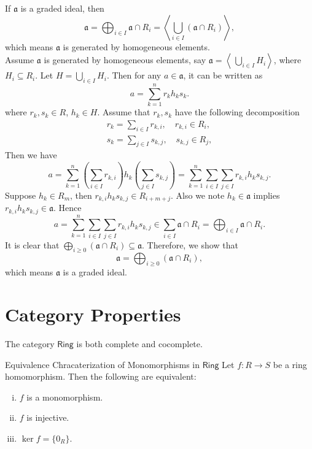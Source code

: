 \begin{prf}
If $\mathfrak{a}$ is a graded ideal, then 
\[
    \mathfrak{a}=\bigoplus_{i\in I}\mathfrak{a}\cap R_i=\left\langle \bigcup_{i\in I}\left( \mathfrak{a}\cap R_i\right)\right\rangle,
\]
which means $\mathfrak{a}$ is generated by homogeneous elements.\\

Assume $\mathfrak a$ is generated by homogeneous elements, say $\mathfrak a = \left\langle\, \bigcup_{i\in I}H_i \right\rangle$, where $H_i\subseteq R_i$. Let $H=\bigcup_{i\in I}H_i $. Then for any $a\in\mathfrak a$, it can be written as
\[
a=\sum_{k=1}^nr_k h_ks_k.
\]
where $r_k,s_k\in R$, $h_k\in H$. Assume that $r_k,s_k$ have the following decomposition
\begin{align*}
    r_k=\sum_{i\in I}r_{k,i},\quad r_{k,i}\in R_i,\\
    s_k=\sum_{j\in I}s_{k,j},\quad s_{k,j}\in R_j,
\end{align*}
Then we have
\[
a=\sum_{k=1}^n\left(\sum_{i\in I}r_{k,i}\right)h_k\left(\sum_{j\in I}s_{k,j}\right)=\sum_{k=1}^n\sum_{i\in I}\sum_{j\in I} r_{k,i}h_ks_{k,j}.
\]
Suppose $h_k\in R_m$, then $r_{k,i}h_ks_{k,j}\in R_{i+m+j}$. Also we note $h_k\in \mathfrak{a}$ implies $r_{k,i}h_ks_{k,j}\in \mathfrak{a}$. Hence 
\[
a=\sum_{k=1}^n\sum_{i\in I}\sum_{j\in I} r_{k,i}h_ks_{k,j}\in \sum_{i\in I} \mathfrak{a} \cap R_i=\bigoplus_{i\in I}\mathfrak{a}\cap R_i.
\]
It is clear that $\bigoplus\limits_{i\geq 0}(\mathfrak a\cap R_i) \subseteq \mathfrak a $. Therefore, we show that
\[
    \mathfrak a=\bigoplus_{i\geq 0}(\mathfrak a\cap R_i) , 
\]
which means $\mathfrak{a}$ is a graded ideal.
\end{prf}


\section{Category Properties}
The category $\mathsf{Ring}$ is both complete and cocomplete.

\begin{proposition}{Equivalence Chracaterization of Monomorphisms in $\mathsf{Ring}$}{}
    Let $f:R\to S$ be a ring homomorphism. Then the following are equivalent:
    \begin{enumerate}[(i)]
        \item $f$ is a monomorphism.
        \item $f$ is injective.
        \item $\ker f=\{0_R\}$.
    \end{enumerate}
\end{proposition}


